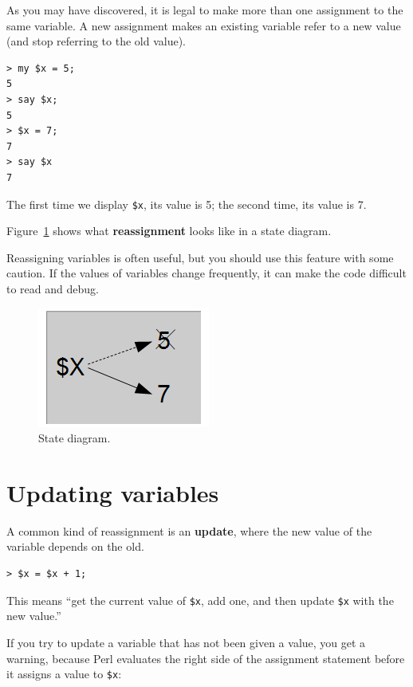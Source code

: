 As you may have discovered, it is legal to make more than one
assignment to the same variable.  A new assignment makes an existing
variable refer to a new value (and stop referring to the old value).

\begin{verbatim}
> my $x = 5;
5
> say $x;
5
> $x = 7;
7
> say $x
7
\end{verbatim}
%
The first time we display 
{\tt \$x}, its value is 5; the second time, its
value is 7.

Figure~\ref{fig.assign2} shows what {\bf reassignment} looks
like in a state diagram.  

Reassigning variables is often useful, but you should use this feature 
with some caution.  If the values of variables change frequently, it can
make the code difficult to read and debug.

\begin{figure}
\centerline
{\includegraphics[scale=0.5]{figs/reassignment.png}}
\caption{State diagram.}
\label{fig.assign2}
\end{figure}



\section{Updating variables}
\label{update}


A common kind of reassignment is an {\bf update},
where the new value of the variable depends on the old.

\begin{verbatim}
> $x = $x + 1;
\end{verbatim}
%
This means ``get the current value of {\tt \$x}, add one, and then
update {\tt \$x} with the new value.''

If you try to update a variable that has not been given a value, 
you get a warning, because Perl evaluates the right side 
of the assignment statement before it assigns a value to {\tt \$x}:

